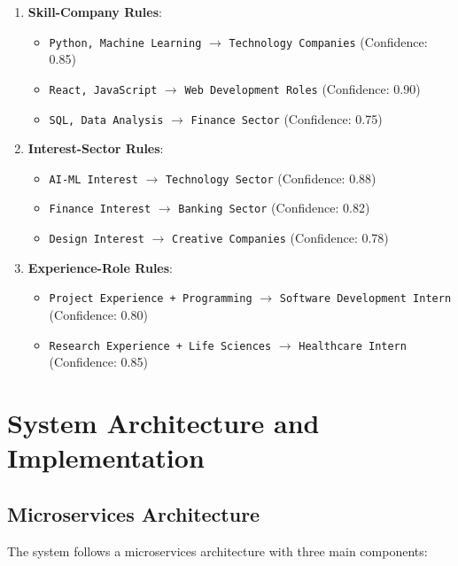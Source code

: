 \documentclass[12pt,a4paper]{article}
\begin{document}
\begin{enumerate}
    \item \textbf{Skill-Company Rules}:
    \begin{itemize}
        \item \texttt{Python, Machine Learning} $\rightarrow$ \texttt{Technology Companies} (Confidence: 0.85)
        \item \texttt{React, JavaScript} $\rightarrow$ \texttt{Web Development Roles} (Confidence: 0.90)
        \item \texttt{SQL, Data Analysis} $\rightarrow$ \texttt{Finance Sector} (Confidence: 0.75)
    \end{itemize}

    \item \textbf{Interest-Sector Rules}:
    \begin{itemize}
        \item \texttt{AI-ML Interest} $\rightarrow$ \texttt{Technology Sector} (Confidence: 0.88)
        \item \texttt{Finance Interest} $\rightarrow$ \texttt{Banking Sector} (Confidence: 0.82)
        \item \texttt{Design Interest} $\rightarrow$ \texttt{Creative Companies} (Confidence: 0.78)
    \end{itemize}

    \item \textbf{Experience-Role Rules}:
    \begin{itemize}
        \item \texttt{Project Experience + Programming} $\rightarrow$ \texttt{Software Development Intern} (Confidence: 0.80)
        \item \texttt{Research Experience + Life Sciences} $\rightarrow$ \texttt{Healthcare Intern} (Confidence: 0.85)
    \end{itemize}
\end{enumerate}

\section{System Architecture and Implementation}

\subsection{Microservices Architecture}
The system follows a microservices architecture with three main components:
\end{document}

